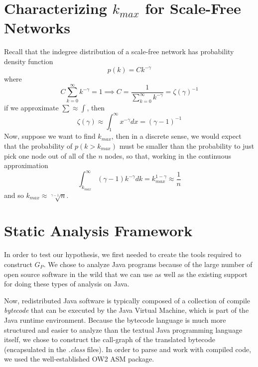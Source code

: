 \documentclass[11pt,a4paper]{article}
\newcommand{\pa}[1]{\left(#1\right)}
\begin{document}
\section*{Characterizing $k_{max}$ for Scale-Free Networks}
Recall that the indegree distribution of a scale-free network has probability 
density function
$$
p(k) = C k^{-\gamma}
$$
where 
$$
C \sum_{k=0}^\infty k^{-\gamma} = 1 \implies 
C = \frac{1}{\sum\limits_{k=0}^\infty k^{-\gamma}} = \zeta(\gamma)^{-1}
$$
if we approximate $\sum \approx \int$, then
$$
\zeta(\gamma) \approx \int_1^\infty x^{-\gamma} dx = \pa{\gamma-1}^{-1}
$$
Now, suppose we want to find $k_{max}$, then in a discrete sense, we would 
expect that the probability of $p(k > k_{max})$ must be smaller than the 
probability to just pick one node out of all of the $n$ nodes, so that, 
working in the continuous approximation
$$
\int_{k_{max}}^\infty (\gamma -1)k^{-\gamma} dk = k_{max}^{1-\gamma} \approx 
\frac{1}{n}
$$
and so $k_{max} \approx \sqrt[\gamma - 1]{n}$. \cite{CLASS}

\section*{Static Analysis Framework}
In order to test our hypothesis, we first needed to create the tools required 
to construct $G_P$. We chose to analyze Java programs because of the large 
number of open source software in the wild that we can use as well as the 
existing support for doing these types of analysis on Java. 

Now, redistributed Java software is typically composed of a collection of 
compile \emph{bytecode} that can be executed by the Java Virtual Machine, 
which is part of the Java runtime environment. Because the bytecode language 
is much more structured and easier to analyze than the textual Java 
programming language itself, we chose to construct the call-graph of the 
translated bytecode (encapsulated in the \emph{.class} files). In order to 
parse and work with compiled code, we used the well-established OW2 ASM 
package. \cite{ocwasm} 
\end{document}
